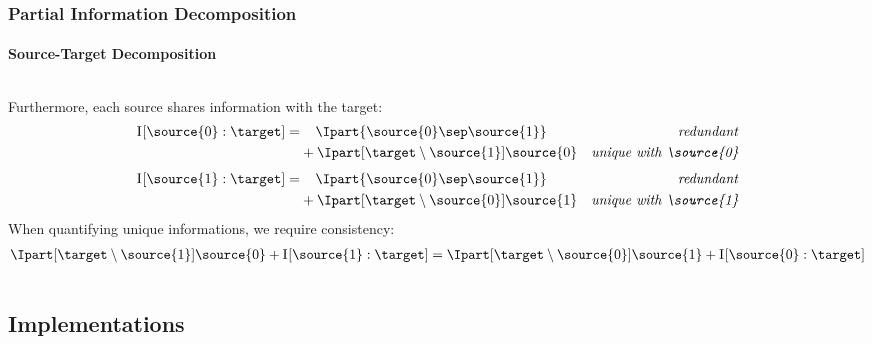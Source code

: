 \documentclass[final,serif,aspectratio=1610]{beamer}
\begin{document}
\begin{frame}
  \frametitle{Partial Information Decomposition~\cite{williams2010nonnegative}}
  \framesubtitle{Source-Target Decomposition}
  \begin{columns}
    \begin{column}{1.0\textwidth}
      \Large
      Furthermore, each source shares information with the target:
      \begin{align*}
        \I{\source{0} : \target} =
          & \phantom{+}~\Ipart{\source{0}\sep\source{1}}
          & \textrm{\emph{redundant}} \\
          & + \Ipart[\target \setminus \source{1}]{\source{0}}
          & \textrm{\emph{unique with \source{0}}}
      \end{align*}
      \begin{align*}
        \I{\source{1} : \target} =
          & \phantom{+}~\Ipart{\source{0}\sep\source{1}}
          & \textrm{\emph{redundant}} \\
          & + \Ipart[\target \setminus \source{0}]{\source{1}}
          & \textrm{\emph{unique with \source{1}}}
      \end{align*}
      \pause When quantifying unique informations, we require consistency:
      \begin{align*}
        \Ipart[\target \setminus \source{1}]{\source{0}} + \I{\source{1} : \target} = \Ipart[\target \setminus \source{0}]{\source{1}} + \I{\source{0} : \target}
      \end{align*}
    \end{column}
  \end{columns}
\end{frame}

\subsection{Implementations}
\end{document}
